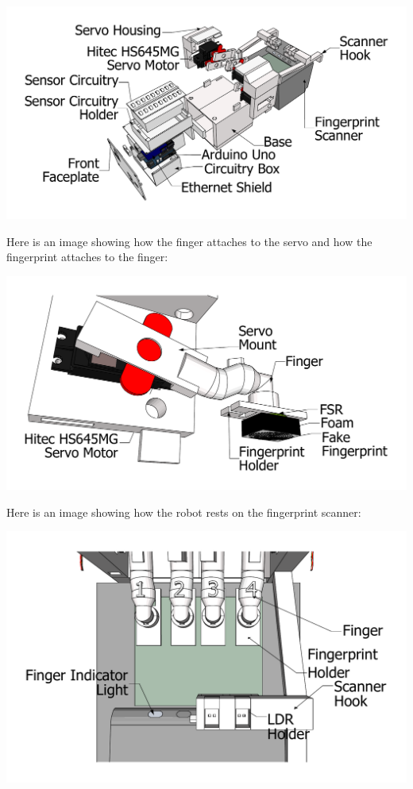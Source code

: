 \documentclass[letterpaper,10pt,english]{sphinxmanual}
\begin{document}
\includegraphics{Scene5N.pdf}

Here is an image showing how the finger attaches to the servo and how the fingerprint attaches to the finger:

\includegraphics{Scene2N.pdf}

Here is an image showing how the robot rests on the fingerprint scanner:

\includegraphics{Scene3N.pdf}
\end{document}
